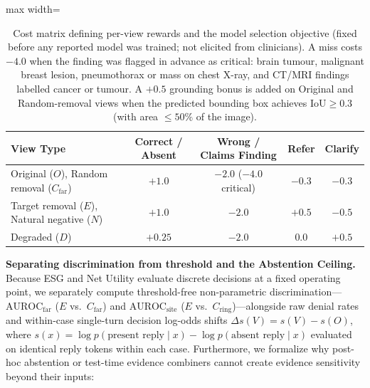 \documentclass[5p,times,twocolumn,authoryear]{elsarticle}
\begin{document}
\begin{table}[!t]
\caption{Cost matrix defining per-view rewards and the model selection objective (fixed before any reported model was trained; not elicited from clinicians). A miss costs $-4.0$ when the finding was flagged in advance as critical: brain tumour, malignant breast lesion, pneumothorax or mass on chest X-ray, and CT/MRI findings labelled cancer or tumour. A $+0.5$ grounding bonus is added on Original and Random-removal views when the predicted bounding box achieves $\text{IoU} \ge 0.3$ (with area $\le 50\%$ of the image).}
\label{tab:cost_matrix}
\vspace{-0.2cm}
\begin{center}
\small
\begin{adjustbox}{max width=\linewidth}
\begin{tabular}{lcccc}
\toprule
\textbf{View Type} & \textbf{Correct / Absent} & \textbf{Wrong / Claims Finding} & \textbf{Refer} & \textbf{Clarify} \\
\midrule
Original ($O$), Random removal ($C_{\text{far}}$) & $+1.0$ & $-2.0$ ($-4.0$ critical) & $-0.3$ & $-0.3$ \\
Target removal ($E$), Natural negative ($N$) & $+1.0$ & $-2.0$ & $+0.5$ & $-0.5$ \\
Degraded ($D$) & $+0.25$ & $-2.0$ & $0.0$ & $+0.5$ \\
\bottomrule
\end{tabular}
\end{adjustbox}
\end{center}
\vspace{-0.2cm}
\end{table}

\textbf{Separating discrimination from threshold and the Abstention Ceiling.} Because ESG and Net Utility evaluate discrete decisions at a fixed operating point, we separately compute threshold-free non-parametric discrimination---$\text{AUROC}_{\text{far}}$ ($E$ vs.\ $C_{\text{far}}$) and $\text{AUROC}_{\text{site}}$ ($E$ vs.\ $C_{\text{ring}}$)---alongside raw denial rates and within-case single-turn decision log-odds shifts $\Delta s(V) = s(V) - s(O)$, where $s(x) = \log p(\text{present reply} \mid x) - \log p(\text{absent reply} \mid x)$ evaluated on identical reply tokens within each case. Furthermore, we formalize why post-hoc abstention or test-time evidence combiners cannot create evidence sensitivity beyond their inputs:
\end{document}
